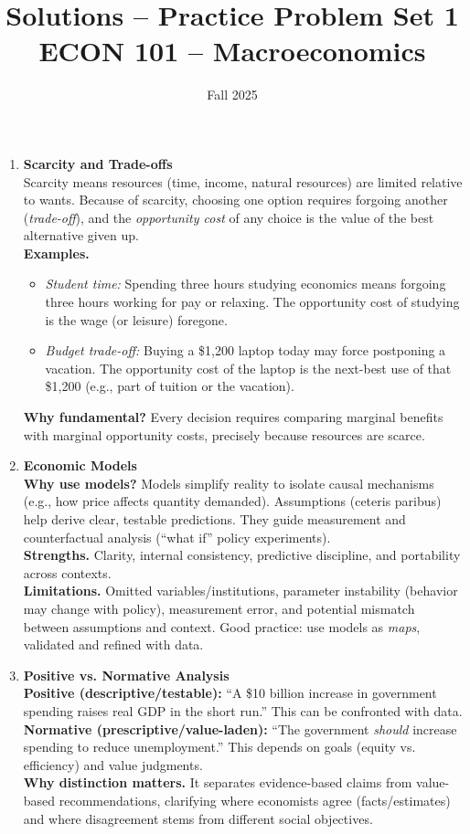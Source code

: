 \documentclass[12pt]{article}
\title{Solutions -- Practice Problem Set 1\\ \vspace{15pt} \large ECON 101 -- Macroeconomics}
\author{}
\date{Fall 2025}
\begin{document}
\maketitle


\begin{enumerate}
\item \textbf{Scarcity and Trade-offs} \\
Scarcity means resources (time, income, natural resources) are limited relative to wants. Because of scarcity, choosing one option requires forgoing another (\emph{trade-off}), and the \emph{opportunity cost} of any choice is the value of the best alternative given up. \\
\textbf{Examples.}
\begin{itemize}
  \item \emph{Student time:} Spending three hours studying economics means forgoing three hours working for pay or relaxing. The opportunity cost of studying is the wage (or leisure) foregone.
  \item \emph{Budget trade-off:} Buying a \$1{,}200 laptop today may force postponing a vacation. The opportunity cost of the laptop is the next-best use of that \$1{,}200 (e.g., part of tuition or the vacation).
\end{itemize}
\textbf{Why fundamental?} Every decision requires comparing marginal benefits with marginal opportunity costs, precisely because resources are scarce.

\item \textbf{Economic Models} \\
\textbf{Why use models?} Models simplify reality to isolate causal mechanisms (e.g., how price affects quantity demanded). Assumptions (ceteris paribus) help derive clear, testable predictions. They guide measurement and counterfactual analysis (``what if'' policy experiments). \\
\textbf{Strengths.} Clarity, internal consistency, predictive discipline, and portability across contexts. \\
\textbf{Limitations.} Omitted variables/institutions, parameter instability (behavior may change with policy), measurement error, and potential mismatch between assumptions and context. Good practice: use models as \emph{maps}, validated and refined with data.

\item \textbf{Positive vs. Normative Analysis} \\
\textbf{Positive (descriptive/testable):} ``A \$10 billion increase in government spending raises real GDP in the short run.'' This can be confronted with data. \\
\textbf{Normative (prescriptive/value-laden):} ``The government \emph{should} increase spending to reduce unemployment.'' This depends on goals (equity vs. efficiency) and value judgments. \\
\textbf{Why distinction matters.} It separates evidence-based claims from value-based recommendations, clarifying where economists agree (facts/estimates) and where disagreement stems from different social objectives.


\end{enumerate}
\end{document}
